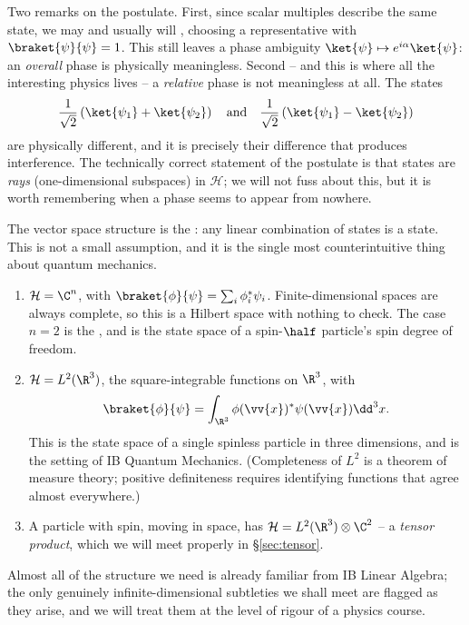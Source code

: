 Two remarks on the postulate. First, since scalar multiples describe the same state, we may and usually will , choosing a representative with $\braket{\psi}{\psi} = 1$. This still leaves a phase ambiguity $\ket{\psi} \mapsto e^{i\alpha}\ket{\psi}$: an \emph{overall} phase is physically meaningless. Second -- and this is where all the interesting physics lives -- a \emph{relative} phase is not meaningless at all. The states
$$
\frac{1}{\sqrt2}\left( \ket{\psi_1} + \ket{\psi_2} \right) \quad \text{and} \quad \frac{1}{\sqrt{2}}\left( \ket{\psi_1} - \ket{\psi_2} \right)
$$
are physically different, and it is precisely their difference that produces interference. The technically correct statement of the postulate is that states are \emph{rays} (one-dimensional subspaces) in $\mathcal{H}$; we will not fuss about this, but it is worth remembering when a phase seems to appear from nowhere.

The vector space structure is the : any linear combination of states is a state. This is not a small assumption, and it is the single most counterintuitive thing about quantum mechanics.

\begin{example}
    \begin{enumerate}[label=(\roman*)]
        \item $\mathcal{H} = \C^n$, with $\braket{\phi}{\psi} = \sum_i \phi_i^* \psi_i$. Finite-dimensional spaces are always complete, so this is a Hilbert space with nothing to check. The case $n=2$ is the , and is the state space of a spin-$\half$ particle's spin degree of freedom.
        \item $\mathcal{H} = L^2(\R^3)$, the square-integrable functions on $\R^3$, with
        $$
        \braket{\phi}{\psi} = \int_{\R^3} \phi(\vv{x})^* \psi(\vv{x}) \dd^3 x.
        $$
        This is the state space of a single spinless particle in three dimensions, and is the setting of IB Quantum Mechanics. (Completeness of $L^2$ is a theorem of measure theory; positive definiteness requires identifying functions that agree almost everywhere.)
        \item A particle with spin, moving in space, has $\mathcal{H} = L^2(\R^3) \otimes \C^2$ -- a \emph{tensor product}, which we will meet properly in \S\ref{sec:tensor}.
    \end{enumerate}
\end{example}

Almost all of the structure we need is already familiar from IB Linear Algebra; the only genuinely infinite-dimensional subtleties we shall meet are flagged as they arise, and we will treat them at the level of rigour of a physics course.

